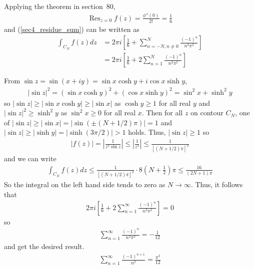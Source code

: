 \documentclass{scrartcl}
\DeclareMathOperator*{\Res}{Res}
\begin{document}
Applying the theorem in section~80,
\begin{align*}
  \Res_{z = 0} f(z) = \frac{\phi''(0)}{2!} = \frac{1}{6}
\end{align*}
and (\ref{sec4_residue_sum}) can be written as
\begin{align*}
  \int_{C_N} f(z) dz
  &= 2\pi i \left[ \frac{1}{6} + \sum^N_{n = -N, n \not = 0} \frac{(-1)^n}{n^2 \pi^2} \right] \\
  &= 2\pi i \left[ \frac{1}{6} + 2\sum^N_{n = 1} \frac{(-1)^n}{n^2 \pi^2} \right]
\end{align*}

From \(\sin z = \sin (x + iy) = \sin x \cosh y + i\cos x \sinh y\),
\begin{align*}
  |\sin z|^2 = (\sin x \cosh y)^2 + (\cos x \sinh y)^2 = \sin^2 x + \sinh^2 y
\end{align*}
so \(|\sin z| \geq |\sin x \cosh y| \geq |\sin x|\) as \(\cosh y \geq 1\) for all real \(y\) and \(|\sin z|^2 \geq \sinh^2 y\) as \(\sin^2 x \geq 0\) for all real \(x\).
Then for all \(z\) on contour \(C_N\), one of \(|\sin z| \geq |\sin x| = |\sin (\pm(N + 1/2)\pi)| = 1\) and \(|\sin z| \geq |\sinh y| = |\sinh (3\pi / 2)| > 1\) holds.
Thus, \(|\sin z| \geq 1\) so
\begin{align*}
  |f(z)| = \left| \frac{1}{z^2 \sin z} \right| \leq \left| \frac{1}{z^2} \right| \leq \frac{1}{[(N + 1/2)\pi]^2}
\end{align*}
and we can write
\begin{align*}
  \int_{C_N} f(z) dz \leq \frac{1}{[(N + 1/2)\pi]^2} \cdot 8 \left( N + \frac{1}{2} \right)\pi \leq \frac{16}{(2N + 1)\pi}
\end{align*}
So the integral on the left hand side tends to zero as \(N \to \infty\).
Thus, it follows that
\begin{align*}
  2\pi i \left[ \frac{1}{6} + 2\sum^\infty_{n = 1} \frac{(-1)^n}{n^2 \pi^2} \right] = 0
\end{align*}
so
\begin{align*}
  \sum^\infty_{n = 1} \frac{(-1)^n}{n^2 \pi^2} = -\frac{1}{12}
\end{align*}
and get the desired result.
\begin{align*}
  \sum^\infty_{n = 1} \frac{(-1)^{n + 1}}{n^2} = \frac{\pi^2}{12}
\end{align*}
\end{document}
